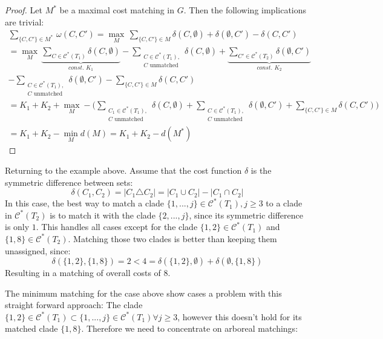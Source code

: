 \begin{proof}
Let $M^*$ be a maximal cost matching in $G$. Then the following implications are trivial:
\begin{gather*}
\sum_{\{C,C'\} \in M^*} \, \omega(C, C') = \max_{M} \, \sum_{\{C,C'\} \in M} \delta(C,\emptyset) + \delta(\emptyset, C') - \delta(C,C') \\
= \max_{M} \, \underbrace{\sum_{C \in \mathcal{C}^*(T_1)} \delta(C,\emptyset)}_{\textit{const. }K_1} - \sum_{\substack{C \in \mathcal{C}^*(T_1),\\ C\text{ unmatched}}} \delta(C,\emptyset) + \underbrace{\sum_{C' \in \mathcal{C}^*(T_2)} \delta(\emptyset, C')}_{\textit{const. }K_2} \\
- \sum_{\substack{C \in \mathcal{C}^*(T_1),\\ C\text{ unmatched}}} \delta(\emptyset, C') - \sum_{\{C,C'\} \in M} \delta(C,C')\\
= K_1 + K_2 + \max_{M} - \bigg( \sum_{\substack{C_1 \in \mathcal{C}^*(T_1),\\ C\text{ unmatched}}} \delta(C, \emptyset) + \sum_{\substack{C \in \mathcal{C}^*(T_1),\\ C\text{ unmatched}}} \delta(\emptyset, C') + \sum_{\{C,C'\} \in M} \delta(C,C') \bigg)\\
= K_1 + K_2 - \min_{M} d(M) = K_1 + K_2 - d(M^*)
\end{gather*}
\end{proof}

Returning to the example above. Assume that the cost function $\delta$ is the symmetric difference between sets:
$$\delta(C_1, C_2) = |C_1 \triangle C_2| = |C_1 \cup C_2| - |C_1 \cap C_2|$$
In this case, the best way to match a clade $\{1,...,j\} \in \mathcal{C}^*(T_1), j \geq 3$ to a clade in $\mathcal{C}^*(T_2)$ is to match it with the clade $\{2,...,j\}$, since its symmetric difference is only $1$. This handles all cases except for the clade $\{1,2\} \in \mathcal{C}^*(T_1)$ and $\{1,8\} \in \mathcal{C}^*(T_2)$. Matching those two clades is better than keeping them unassigned, since:
$$\delta(\{1,2\},\{1,8\}) = 2 < 4 = \delta(\{1,2\},\emptyset) + \delta(\emptyset, \{1,8\})$$
Resulting in a matching of overall costs of $8$.

The minimum matching for the case above show cases a problem with this straight forward approach: The clade $\{1,2\} \in \mathcal{C}^*(T_1) \subset \{1,...,j\} \in \mathcal{C}^*(T_1) \forall j \geq 3$, however this doesn't hold for its matched clade $\{1,8\}$. Therefore we need to concentrate on arboreal matchings:

